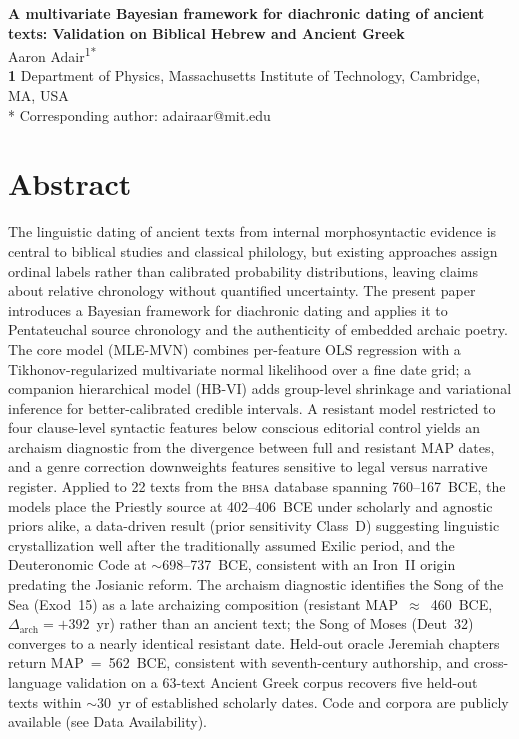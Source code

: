 \documentclass[10pt,letterpaper]{article}
\newcommand{\bhsa}{\textsc{bhsa}}
\newcommand{\mvn}{MLE-MVN}
\newcommand{\hbvi}{HB-VI}
\begin{document}
\vspace*{0.2in}

\begin{flushleft}
{\Large
\textbf{A multivariate Bayesian framework for diachronic dating of ancient
texts: Validation on Biblical Hebrew and Ancient Greek}
}
\newline
\\
Aaron Adair\textsuperscript{1*}
\\
\bigskip
\textbf{1} Department of Physics, Massachusetts Institute of Technology, Cambridge, MA, USA
\\
\bigskip
* Corresponding author: adairaar@mit.edu

\end{flushleft}

\section*{Abstract}

The linguistic dating of ancient texts from internal morphosyntactic
evidence is central to biblical studies and classical philology, but
existing approaches assign ordinal labels rather than calibrated
probability distributions, leaving claims about relative chronology
without quantified uncertainty.  The present paper introduces a Bayesian
framework for diachronic dating and applies it to Pentateuchal source
chronology and the authenticity of embedded archaic poetry.  The core model (\mvn{}) combines
per-feature OLS regression with a Tikhonov-regularized multivariate normal
likelihood over a fine date grid; a companion hierarchical model (\hbvi{})
adds group-level shrinkage and variational inference for better-calibrated
credible intervals.  A resistant model restricted to four clause-level
syntactic features below conscious editorial control yields an archaism
diagnostic from the divergence between full and resistant MAP dates, and a
genre correction downweights features sensitive to legal versus narrative
register.  Applied to 22 texts from the \bhsa{} database spanning
760--167~BCE, the models place the Priestly source at 402--406~BCE under
scholarly and agnostic priors alike, a data-driven result (prior
sensitivity Class~D) suggesting
linguistic crystallization well after the traditionally assumed Exilic
period, and the Deuteronomic Code at $\sim$698--737~BCE, consistent with an
Iron~II origin predating the Josianic reform.  The archaism diagnostic
identifies the Song of the Sea (Exod~15) as a late archaizing composition
(resistant MAP~$\approx$~460~BCE, $\Delta_{\text{arch}} = {+}392$~yr)
rather than an ancient text; the Song of Moses (Deut~32) converges to a
nearly identical resistant date.  Held-out oracle Jeremiah chapters return
MAP~=~562~BCE, consistent with seventh-century authorship, and
cross-language validation on a 63-text Ancient Greek corpus recovers five
held-out texts within $\sim$30~yr of established scholarly dates.
Code and corpora are publicly available (see Data Availability).
\end{document}
